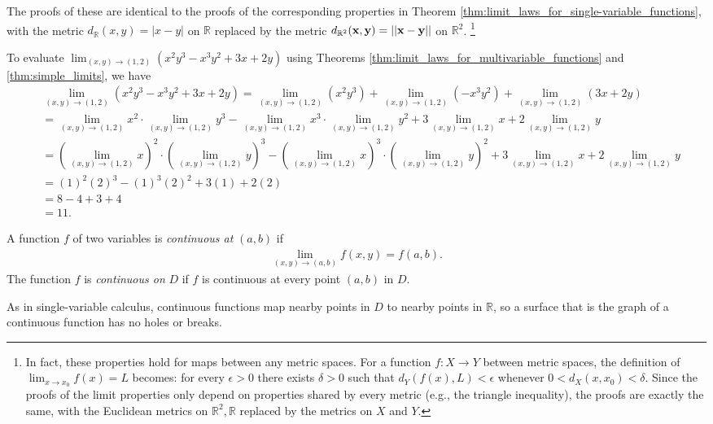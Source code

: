 \documentclass[12pt,letterpaper,reqno]{article}
\numberwithin{equation}{section}
\newcommand{\R}{\ensuremath{\mathbb R}}
\newcommand{\bx}{{\bf x}}
\newcommand{\by}{{\bf y}}
\begin{document}
{\begin{pf}
The proofs of these are identical to the proofs of the corresponding properties in Theorem \ref{thm:limit_laws_for_single-variable_functions}, with the metric $d_\R(x,y)=|x-y|$ on $\R$ replaced by the metric $d_{\R^2}(\bx,\by)=||\bx-\by||$ on $\R^2$. \footnote{In fact, these properties hold for maps between any metric spaces. For a function $f:X \to Y$ between metric spaces, the definition of $\lim_{x \to x_0}f(x)=L$ becomes: for every $\epsilon>0$ there exists $\delta>0$ such that $d_Y(f(x),L)<\epsilon$ whenever $0<d_X(x,x_0)<\delta$. Since the proofs of the limit properties only depend on properties shared by every metric (e.g., the triangle inequality), the proofs are exactly the same, with the Euclidean metrics on $\R^2, \R$ replaced by the metrics on $X$ and $Y$.}   
\end{pf}

\begin{example}
To evaluate $\lim_{(x,y) \to (1,2)}(x^2y^3-x^3y^2+3x+2y)$ using Theorems \ref{thm:limit_laws_for_multivariable_functions} and \ref{thm:simple_limits}, we have
\begin{align*}
	&\lim_{(x,y) \to (1,2)}(x^2y^3-x^3y^2+3x+2y)=\lim_{(x,y) \to (1,2)}(x^2y^3)+\lim_{(x,y) \to (1,2)}(-x^3y^2)+\lim_{(x,y) \to (1,2)}(3x+2y) \\
	&=\lim_{(x,y) \to (1,2)}x^2\cdot \lim_{(x,y) \to (1,2)}y^3 - \lim_{(x,y) \to (1,2)} x^3\cdot \lim_{(x,y) \to (1,2)} y^2+3\lim_{(x,y) \to (1,2)} x+2\lim_{(x,y) \to (1,2)}y \\
	&=(\lim_{(x,y) \to (1,2)}x)^2\cdot (\lim_{(x,y) \to (1,2)}y)^3 - (\lim_{(x,y) \to (1,2)} x)^3\cdot (\lim_{(x,y) \to (1,2)} y)^2+3\lim_{(x,y) \to (1,2)} x+2\lim_{(x,y) \to (1,2)}y \\ 
	&=(1)^2(2)^3-(1)^3(2)^2+3(1)+2(2) \\
	&=8-4+3+4 \\
	&=11.
\end{align*} 	
\end{example}

\begin{defn}
 A function $f$ of two variables is \emph{continuous at} $(a,b)$ if
\begin{align*}
	\lim_{(x,y) \to (a,b)}f(x,y)=f(a,b).
\end{align*}
The function $f$ is \emph{continuous on} $D$ if $f$ is continuous at every point $(a,b)$ in $D$.	
\end{defn}
As in single-variable calculus, continuous functions map nearby points in $D$ to nearby points in $\mathbb{R}$, so a surface that is the graph of a continuous function has no holes or breaks.

}
\end{document}
